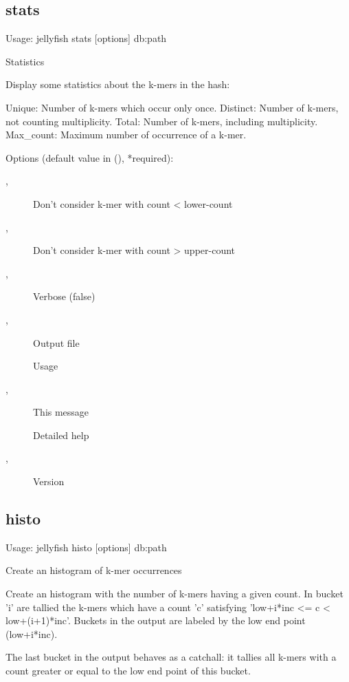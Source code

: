 \subsection{stats}
\noindent Usage: jellyfish stats [options] db:path

\noindent Statistics

\noindent Display some statistics about the k-mers in the hash:

\noindent Unique:    Number of k-mers which occur only once.
\noindent Distinct:  Number of k-mers, not counting multiplicity.
\noindent Total:     Number of k-mers, including multiplicity.
\noindent Max\_count: Maximum number of occurrence of a k-mer.

\noindent Options (default value in (), *required):
\begin{description}
\item[,] \noindent Don't consider k-mer with count < lower-count
\item[,] \noindent Don't consider k-mer with count > upper-count
\item[,] \noindent Verbose (false)
\item[,] \noindent Output file
\item[] \noindent Usage
\item[,] \noindent This message
\item[] \noindent Detailed help
\item[,] \noindent Version
\end{description}

\subsection{histo}
\noindent Usage: jellyfish histo [options] db:path

\noindent Create an histogram of k-mer occurrences

\noindent Create an histogram with the number of k-mers having a given
\noindent count. In bucket 'i' are tallied the k-mers which have a count 'c'
\noindent satisfying 'low+i*inc <= c < low+(i+1)*inc'. Buckets in the output are
\noindent labeled by the low end point (low+i*inc).

\noindent The last bucket in the output behaves as a catchall: it tallies all
\noindent k-mers with a count greater or equal to the low end point of this
\noindent bucket.

